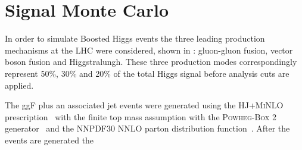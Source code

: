 \section{Signal Monte Carlo} \label{sec:data:signal_mc}

In order to simulate Boosted Higgs events the three leading production mechanisms at
the LHC were considered, shown in : gluon-gluon
fusion, vector boson fusion and Higgstralungh.  These three production modes
correspondingly represent 50\%, 30\% and 20\% of the total Higgs signal before
analysis cuts are applied. 

The ggF plus an associated jet events were generated using the
\textsc{HJ+MiNLO} prescription~\cite{Hamilton2015} with the finite top mass
assumption with the \textsc{Powheg-Box} 2 generator~\cite{Campbell:2012} and
the NNPDF30 NNLO parton distribution function~\cite{Hamilton:2012rf}.  After the events 
are generated the 
